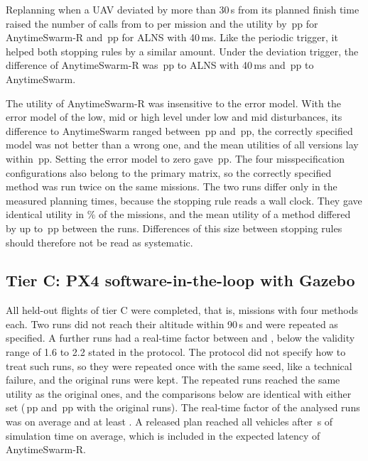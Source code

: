 Replanning when a UAV deviated by more than 30\,s from its planned finish time raised the number of calls from
 to  per mission and the utility by \,pp for
AnytimeSwarm-R and \,pp for ALNS with 40\,ms. Like the periodic trigger, it helped both
stopping rules by a similar amount. Under the deviation trigger, the difference of AnytimeSwarm-R was
\,pp to ALNS with 40\,ms and \,pp to AnytimeSwarm.

The utility of AnytimeSwarm-R was insensitive to the error model. With the error model of the low, mid or high level
under low and mid disturbances, its difference to AnytimeSwarm ranged between \,pp and
\,pp, the correctly specified model was not better than a wrong one, and the mean utilities of all
versions lay within \,pp. Setting the error model to zero gave
\,pp. The four misspecification configurations also belong to the primary matrix, so the correctly
specified method was run twice on the same missions. The two runs differ only in the measured planning times, because
the stopping rule reads a wall clock. They gave identical utility in \% of the missions, and the
mean utility of a method differed by up to \,pp between the runs. Differences of this size between
stopping rules should therefore not be read as systematic.

\subsection{Tier C: PX4 software-in-the-loop with Gazebo}\label{sec:res-tierc}
All  held-out flights of tier C were completed, that is,  missions with four methods each. Two runs
did not reach their altitude within 90\,s and were repeated as specified. A further  runs had a real-time
factor between  and , below the validity range of 1.6 to 2.2 stated in the
protocol. The protocol did not specify how to treat such runs, so they were repeated once with the same seed, like a
technical failure, and the original runs were kept. The repeated runs reached the same utility as the original ones, and
the comparisons below are identical with either set (\,pp and \,pp with the
original runs). The real-time factor of the analysed runs was  on average and at least . A
released plan reached all vehicles after \,s of simulation time on average, which is included in the expected
latency of AnytimeSwarm-R.

